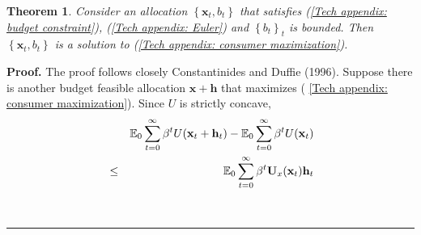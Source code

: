 \documentclass[thmsb,11pt]{article}
\newtheorem{theorem}{Theorem}
\newenvironment{proof}[1][Proof]{\noindent \textbf{#1.} }{\  \rule{0.5em}{0.5em}}
\begin{document}
\begin{theorem}

\smallskip Consider an allocation $\left \{ \mathbf{x}_{t},b_{t}\right \} $
that satisfies (\ref{Tech appendix: budget constraint}), (\ref{Tech
appendix: Euler}) and $\left \{ b_{t}\right \} _{t}$ is bounded. Then $%
\left
\{ \mathbf{x}_{t},b_{t}\right \} $ is a solution to (\ref{Tech
appendix: consumer maximization}).

\end{theorem}
\begin{proof}
The proof follows closely Constantinides and Duffie (1996). Suppose there is
another budget feasible allocation $\mathbf{x}+\mathbf{h}$ that maximizes (%
\ref{Tech appendix: consumer maximization}). Since $U$ is strictly concave,
\begin{eqnarray}
&&\mathbb{E}_{0}\sum_{t=0}^{\infty }\beta ^{t}U(\mathbf{x}_{t}+\mathbf{h}%
_{t})-\mathbb{E}_{0}\sum_{t=0}^{\infty }\beta ^{t}U(\mathbf{x}_{t})
\label{Tech appendix: gain from h} \\
&\leq &\mathbb{E}_{0}\sum_{t=0}^{\infty }\beta ^{t}\mathbf{U}_{x}(\mathbf{x}%
_{t})\mathbf{h}_{t}  \notag
\end{eqnarray}


\end{proof}
\end{document}
